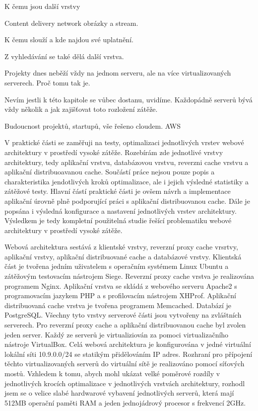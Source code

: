 \documentclass[12pt]{article}
\begin{document}
K čemu jsou další vrstvy

Content delivery network obrázky a stream.

K čemu slouží a kde najdou své uplatnění.

Z vyhledávání se také dělá další vrstva.



Projekty dnes neběží vždy na jednom serveru, ale na více virtualizovaných serverech. Proč tomu tak je.


Nevím jestli k této kapitole se vůbec dostanu, uvidíme. Každopádně serverů bývá vždy několik a jak zajišťovat toto rozložení zátěže.


Budoucnost projektů, startupů, vše řešeno cloudem. AWS




V praktické části se zaměřuji na testy, optimalizaci jednotlivých vrstev webové architektury v prostředí vysoké zátěže. Rozebírám zde jednotlivé vrstvy architektury, tedy aplikační vrstvu, databázovou vrstvu, reverzni cache vrstvu a aplikační distribuoavanou cache. Součástí práce nejsou pouze popis a charakteristika jendotlivých kroků optimalizace, ale i jejich výsledné statistiky a zátěžové testy. Hlavní částí praktické části je ovšem návrh a implementace aplikační úrovně plně podporující práci s aplikační distribuovanou cache. Dále je popsána i výsledná konfigurace a nastavení jednotlivých vrstev architektury. Výsledkem je tedy kompletní použitelná studie řešící problematiku webové architektury v prostředí vysoké zátěže.

Webová architektura sestává z klientské vrstvy, reverzní proxy cache vrsrtvy, aplikační vrstvy, aplikační distribuované cache a databázové vrstvy. Klientská část je tvořena jedním uživatelem s operačním systémem Linux Ubuntu a zátěžovým testovacím nástrojem Siege. Reverzní proxy cache vrstva je realizována programem Nginx. Aplikační vrstva se skládá z webového serveru Apache2 s programovacím jazykem PHP a s profilovacím nástrojem XHProf. Aplikační distribuovaná cache vrstva je tvořena programem Memcached. Databází je PostgreSQL. Všechny tyto vrstvy serverové části jsou vytvořeny na zvláštních serverech. Pro reverzní proxy cache a aplikační distribuovanou cache byl zvolen jeden server. Každý ze serverů je virtualiziován za pomoci virtualizačního nástroje VirtualBox. Celá webová architektura je konfigurována v jedné virtuální lokální síti 10.9.0.0/24 se statikým přidělováním IP adres. Rozhraní pro přípojení těchto virtualizovaných serverů do virtuální sítě je realizováno pomocí síťových mostů. Vzhledem k tomu, abych mohl ukázat velké poměrové rozdíly v jednotlivých krocích optimalizace v jednotlivých vrstvách architektury, rozhodl jsem se o velice slabé hardwarové vybavení jednotlivých serverů, která mají 512MB operační paměti RAM a jeden jednojádrový procesor s frekvencí 2GHz.
\end{document}
